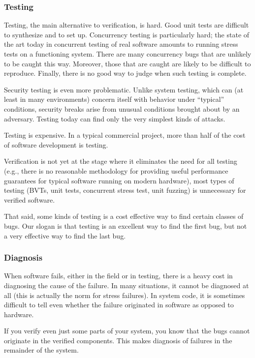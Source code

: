 \documentclass{report}
\begin{document}
\subsubsection{Testing}
Testing, the main alternative to verification, is hard. Good unit
tests are difficult to synthesize and to set up. Concurrency testing
is particularly hard; the state of the art today in concurrent testing
of real software amounts to running stress tests on a functioning
system. There are many concurrency bugs that are unlikely to be
caught this way. Moreover, those that are caught are likely to be
difficult to reproduce. Finally, there is no good way to judge when
such testing is complete.

Security testing is even more problematic. Unlike system testing,
which can (at least in many environments) concern itself with behavior
under ``typical'' conditions, security breaks arise from unusual
conditions brought about by an adversary. Testing today can find
only the very simplest kinds of attacks. 

Testing is expensive. In a typical commercial project, more than half
of the cost of software development is testing. 

Verification is not yet at the stage where it eliminates the need for
all testing (e.g., there is no reasonable methodology for providing
useful performance guarantees for typical software running on modern
hardware), most types of testing (BVTs, unit tests, concurrent stress
test, unit fuzzing) is unnecessary for verified software.

That said, some kinds of testing is a cost effective way to find
certain classes of bugs. Our slogan is that testing is an excellent
way to find the first bug, but not a very effective way to find the
last bug.

\subsubsection{Diagnosis}
When software fails, either in the field or in testing, there is a
heavy cost in diagnosing the cause of the failure. In many situations,
it cannot be diagnosed at all (this is actually the norm for stress
failures). In system code, it is sometimes difficult to tell even whether the
failure originated in software as opposed to hardware.

If you verify even just some parts of your system, you know that the
bugs cannot originate in the verified components. This makes diagnosis
of failures in the remainder of the system. 
\end{document}
